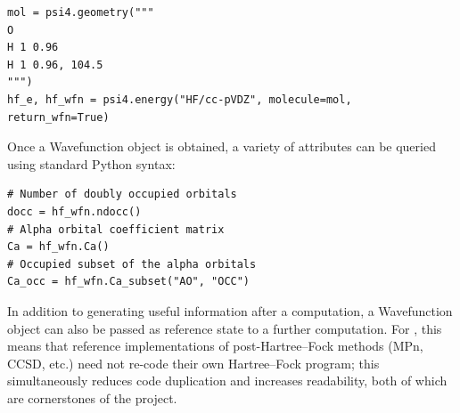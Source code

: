 \documentclass[%
  class = book,%
  crop = false,%
  float = true,%
  multi = true,%
  preview = false,%
]{standalone}
\begin{document}
\begin{verbatim}
mol = psi4.geometry("""
O
H 1 0.96
H 1 0.96, 104.5
""")
hf_e, hf_wfn = psi4.energy("HF/cc-pVDZ", molecule=mol, return_wfn=True)
\end{verbatim}
Once a Wavefunction object is obtained, a variety of attributes can be queried
using standard Python syntax:

\begin{verbatim}
# Number of doubly occupied orbitals
docc = hf_wfn.ndocc()
# Alpha orbital coefficient matrix
Ca = hf_wfn.Ca()
# Occupied subset of the alpha orbitals
Ca_occ = hf_wfn.Ca_subset("AO", "OCC")
\end{verbatim}
In addition to generating useful information after a computation, a Wavefunction object can also be passed as reference state to a further computation.  For \pfn, this means that reference implementations of post-Hartree--Fock methods (MPn, CCSD, etc.) need not re-code their own Hartree--Fock program; this simultaneously reduces code duplication and increases readability, both of which are cornerstones of the \pfn project.




\end{document}
